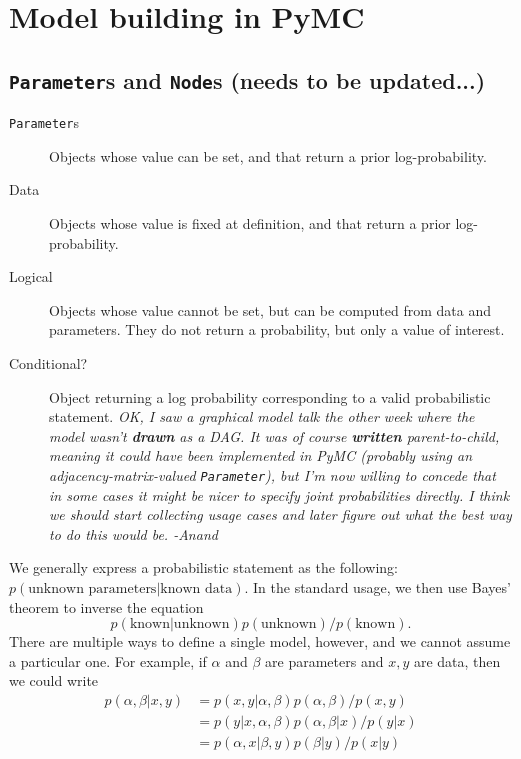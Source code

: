 \documentclass[]{book}
\begin{document}

\chapter{Model building in PyMC} 

\section{\texttt{Parameter}s and \texttt{Node}s (needs to be updated...)}\label{sec:PyMCObjects} %


\begin{description}
\item[\texttt{Parameter}s] Objects whose value can be set, and that return a prior log-probability.
\item[Data] Objects whose value is fixed at definition, and that return a prior log-probability.
\item[Logical] Objects whose value cannot be set, but can be computed from data and parameters. They do not return a probability, but only a value of interest.
\item[Conditional?] Object returning a log probability corresponding to a valid probabilistic statement. \emph{OK, I saw a graphical model talk the other week where the model wasn't \textbf{drawn} as a DAG. It was of course \textbf{written} parent-to-child, meaning it could have been implemented in PyMC (probably using an adjacency-matrix-valued \texttt{Parameter}), but I'm now willing to concede that in some cases it might be nicer to specify joint probabilities directly. I think we should start collecting usage cases and later figure out what the best way to do this would be. -Anand}
\end{description}

We generally express a probabilistic statement as the following:
$p(\textrm{unknown parameters}| \textrm{known data})$. In the standard usage, we then use Bayes' theorem to inverse the equation
$$p(\textrm{known}| \textrm{unknown})p(\textrm{unknown} )/p(\textrm{known} ).$$ There are multiple ways to define a single model, however, and we cannot assume  a particular one. For example, if $\alpha$ and $\beta$ are parameters and $x,y $ are data, then we could write
\begin{align}
p(\alpha, \beta|x,y) & = p(x,y|\alpha , \beta)p(\alpha,\beta)/p(x,y)\\
& =p(y|x,\alpha,\beta)p(\alpha,\beta|x)/p(y|x )\\
& = p(\alpha, x|\beta ,y)p(\beta|y)/p(x|y)
\end{align}
\end{document}
